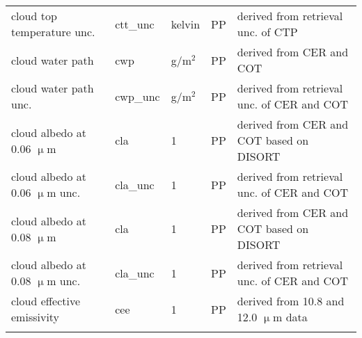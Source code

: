 \begin{table*}[h]
\begin{tabular}{l|l|l|l|l}
    cloud top temperature unc. & ctt\_unc & kelvin & PP & derived from retrieval unc. of CTP \\
    cloud water path & cwp & g/m$^2$ & PP & derived from CER and COT \citep{Han94} \\
    cloud water path unc. & cwp\_unc & g/m$^2$ & PP & derived from retrieval unc. of CER and COT \\
    cloud albedo at 0.06 $\upmu$m & cla & 1 & PP & derived from CER and COT based on DISORT \citep{Laszlo16} \\
    cloud albedo at 0.06 $\upmu$m unc. & cla\_unc & 1 & PP & derived from retrieval unc. of CER and COT \\
    cloud albedo at 0.08 $\upmu$m & cla & 1 & PP & derived from CER and COT based on DISORT \citep{Laszlo16}\\
    cloud albedo at 0.08 $\upmu$m unc. & cla\_unc & 1 & PP & derived from retrieval unc. of CER and COT \\
    cloud effective emissivity & cee & 1 & PP & derived from 10.8 and 12.0 $\upmu$m data \\
    \bottomhline
  \end{tabular}
  \label{tab:L2_variables}
\end{table*}

\clearpage

